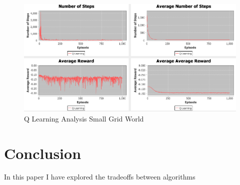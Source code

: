 \documentclass[11pt]{article}
\newcommand{\problemone}{Small Grid World}
\begin{document}
    \begin{figure}
        \begin{minipage}{1\textwidth}
            \centering
            \includegraphics[width=1\linewidth]{qlearningdeepdive.png}
            \caption{Q Learning Analysis \problemone}\label{Fig:Q-Learning DD \problemone}
        \end{minipage}
    \end{figure}
    \section{Conclusion}
    In this paper I have explored the tradeoffs between algorithms
    
    
\end{document}
